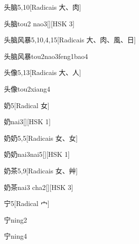 \begin{entry}{头脑}{5,10}[Radicais ⼤、⾁]
  \begin{phonetics}{头脑}{tou2 nao3}[][HSK 3]
  \end{phonetics}
\end{entry}

\begin{entry}{头脑风暴}{5,10,4,15}[Radicais ⼤、⾁、⾵、⽇]
  \begin{phonetics}{头脑风暴}{tou2nao3feng1bao4}
  \end{phonetics}
\end{entry}

\begin{entry}{头像}{5,13}[Radicais ⼤、⼈]
  \begin{phonetics}{头像}{tou2xiang4}
  \end{phonetics}
\end{entry}

\begin{entry}{奶}{5}[Radical ⼥]
  \begin{phonetics}{奶}{nai3}[][HSK 1]
  \end{phonetics}
\end{entry}

\begin{entry}{奶奶}{5,5}[Radicais ⼥、⼥]
  \begin{phonetics}{奶奶}{nai3nai5}[][HSK 1]
  \end{phonetics}
\end{entry}

\begin{entry}{奶茶}{5,9}[Radicais ⼥、⾋]
  \begin{phonetics}{奶茶}{nai3 cha2}[][HSK 3]
  \end{phonetics}
\end{entry}

\begin{entry}{宁}{5}[Radical ⼧]
  \begin{phonetics}{宁}{ning2}
  \end{phonetics}
  \begin{phonetics}{宁}{ning4}
  \end{phonetics}
\end{entry}

